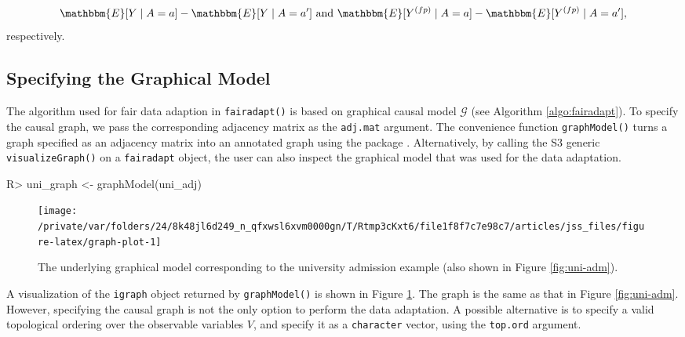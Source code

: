 \documentclass[
  nojss]{jss}
\begin{document}
\[\mathbbm{E}[Y \mid A = a] - \mathbbm{E}[Y \mid A = a'] \text{ and } \mathbbm{E}[ {Y}^{(fp)} \mid A = a] - \mathbbm{E}[ {Y}^{(fp)} \mid A = a'],\]
respectively.

\hypertarget{specifying-the-graphical-model}{%
\subsection{Specifying the Graphical
Model}\label{specifying-the-graphical-model}}

The algorithm used for fair data adaption in \texttt{fairadapt()} is
based on graphical causal model \(\mathcal{G}\) (see Algorithm
\ref{algo:fairadapt}). To specify the causal graph, we pass the
corresponding adjacency matrix as the \texttt{adj.mat} argument. The
convenience function \texttt{graphModel()} turns a graph specified as an
adjacency matrix into an annotated graph using the  package
\citep{csardi2006igraph}. Alternatively, by calling the S3 generic
\texttt{visualizeGraph()} on a \texttt{fairadapt} object, the user can
also inspect the graphical model that was used for the data adaptation.

\begin{CodeChunk}
\begin{CodeInput}
R> uni_graph <- graphModel(uni_adj)
\end{CodeInput}
\end{CodeChunk}

\begin{CodeChunk}
\begin{figure}

{\centering \texttt{[image: /private/var/folders/24/8k48jl6d249\_n\_qfxwsl6xvm0000gn/T/Rtmp3cKxt6/file1f8f7c7e98c7/articles/jss\_files/figure-latex/graph-plot-1]} 

}

\caption{The underlying graphical model corresponding to the university admission example (also shown in Figure \ref{fig:uni-adm}).}\label{fig:graph-plot}
\end{figure}
\end{CodeChunk}

A visualization of the \texttt{igraph} object returned by
\texttt{graphModel()} is shown in Figure \ref{fig:graph-plot}. The graph
is the same as that in Figure \ref{fig:uni-adm}. However, specifying the
causal graph is not the only option to perform the data adaptation. A
possible alternative is to specify a valid topological ordering over the
observable variables \(V\), and specify it as a \texttt{character}
vector, using the \texttt{top.ord} argument.
\end{document}
